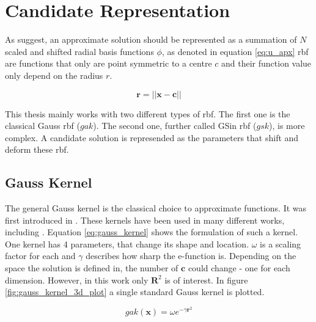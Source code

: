 \documentclass[./\jobname.tex]{subfiles}
\begin{document}
\section{Candidate Representation}
\label{chap:candidate_rep}

As \cite{chaquet_using_2019} suggest, an approximate solution should be represented as a summation of $N$ scaled and shifted radial basis functions $\phi$, as denoted in equation \ref{eq:u_apx}  \gls{rbf} are functions that only are point symmetric to a centre $c$ and their function value only depend on the radius $r$. 

\begin{equation}
\label{eq: radius}
\mathbf{r} = \left|\left|\mathbf{x} - \mathbf{c} \right|\right|
\end{equation}

This thesis mainly works with two different types of \gls{rbf}. The first one is the classical Gauss \gls{rbf} ($gak$). The second one, further called GSin \gls{rbf} ($gsk$), is more complex. A candidate solution is represended as the parameters that shift and deform these \gls{rbf}. 

\subsection{Gauss Kernel}
\label{chap:gauss_kernel}

The general Gauss kernel is the classical choice to approximate functions. It was first introduced in \cite{broomhead_multivariable_1988}. These kernels have been used in many different works, including \cite{chaquet_using_2019}.  Equation \ref{eq:gauss_kernel} shows the formulation of such a kernel. One kernel has 4 parameters, that change its shape and location. $\omega$ is a scaling factor for each and $\gamma$ describes how sharp the e-function is. Depending on the space the solution is defined in, the number of $\mathbf{c}$ could change - one for each dimension. However, in this work only $\mathbf{R}^2$ is of interest. In figure \ref{fig:gauss_kernel_3d_plot} a single standard Gauss kernel is plotted. 

\begin{equation}
\label{eq:gauss_kernel}
gak(\mathbf{x}) = \omega e^{-\gamma \mathbf{r}^2}
\end{equation}
\end{document}
